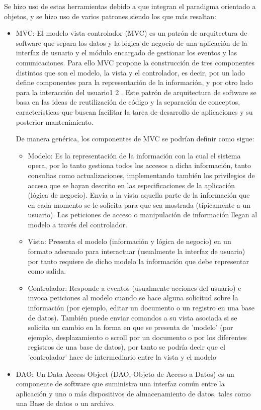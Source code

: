 \documentclass[letterpaper,11pt]{article}
\begin{document}
Se hizo uso de estas herramientas debido a que integran el paradigma orientado a objetos, y se hizo uso de varios patrones siendo los que más resaltan:
\begin{itemize}
\item{MVC:} El modelo vista controlador (MVC) es un patrón de arquitectura de software que separa los datos y la lógica de negocio de una aplicación de la interfaz de usuario y el módulo encargado de gestionar los eventos y las comunicaciones. Para ello MVC propone la construcción de tres componentes distintos que son el modelo, la vista y el controlador, es decir, por un lado define componentes para la representación de la información, y por otro lado para la interacción del usuario1 2 . Este patrón de arquitectura de software se basa en las ideas de reutilización de código y la separación de conceptos, características que buscan facilitar la tarea de desarrollo de aplicaciones y su posterior mantenimiento.

De manera genérica, los componentes de MVC se podrían definir como sigue:
\begin{itemize}
\item{Modelo:} Es la representación de la información con la cual el sistema opera, por lo tanto gestiona todos los accesos a dicha información, tanto consultas como actualizaciones, implementando también los privilegios de acceso que se hayan descrito en las especificaciones de la aplicación (lógica de negocio). Envía a la vista aquella parte de la información que en cada momento se le solicita para que sea mostrada (típicamente a un usuario). Las peticiones de acceso o manipulación de información llegan al modelo a través del controlador.
\item{Vista:} Presenta el modelo (información y lógica de negocio) en un formato adecuado para interactuar (usualmente la interfaz de usuario) por tanto requiere de dicho modelo la información que debe representar como salida.
\item{Controlador:} Responde a eventos (usualmente acciones del usuario) e invoca peticiones al modelo cuando se hace alguna solicitud sobre la información (por ejemplo, editar un documento o un registro en una base de datos). También puede enviar comandos a su vista asociada si se solicita un cambio en la forma en que se presenta de 'modelo' (por ejemplo, desplazamiento o scroll por un documento o por los diferentes registros de una base de datos), por tanto se podría decir que el 'controlador' hace de intermediario entre la vista y el modelo
\end{itemize}
\item{DAO:} Un Data Access Object (DAO, Objeto de Acceso a Datos) es un componente de software que suministra una interfaz común entre la aplicación y uno o más dispositivos de almacenamiento de datos, tales como una Base de datos o un archivo.



\end{itemize}
\end{document}
